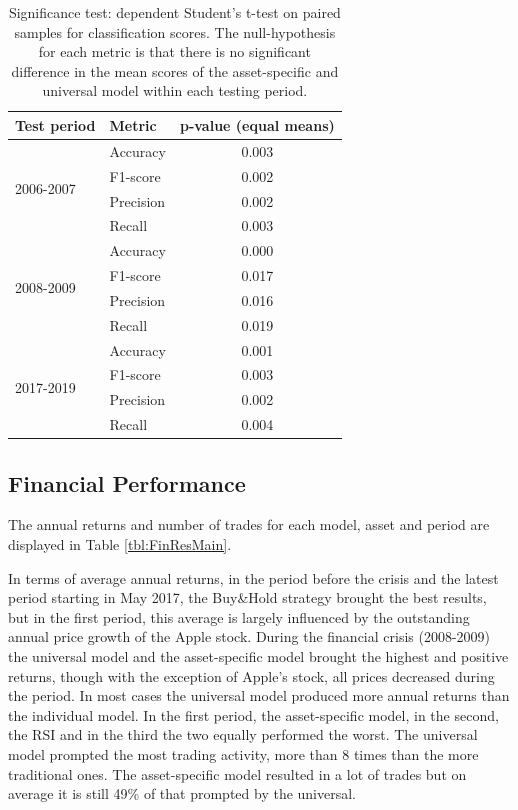 \documentclass[11pt, a4paper]{article}
\begin{document}
\begin{table}[H]
\centering
\begin{tabular}{l|l|c}
 Test period & Metric    & \multicolumn{1}{c}{p-value (equal means)} \\ \hline \hline
 \multirow{4}{1cm}{2006-2007}  & Accuracy  & 0.003                  \\
 & F1-score   & 0.002                  \\
 & Precision & 0.002                  \\
 & Recall  & 0.003                  \\ \hline
 \multirow{4}{1cm}{2008-2009} & Accuracy  & 0.000                  \\
 & F1-score   & 0.017                  \\
 & Precision & 0.016                  \\
 & Recall  & 0.019                  \\ \hline
 \multirow{4}{1cm}{2017-2019} & Accuracy  & 0.001                  \\
 & F1-score   & 0.003                  \\
 & Precision & 0.002                  \\
 & Recall  & 0.004                 
\end{tabular}
\caption{Significance test: dependent Student's t-test on paired samples for classification scores. The null-hypothesis for each metric is that there is no significant difference in the mean scores of the asset-specific and universal model within each testing period.}
\label{tbl:ClassSign}
\end{table}

\subsection{Financial Performance}
\label{subsec:ER:FinPerf}

The annual returns and number of trades for each model, asset and period are displayed in Table \ref{tbl:FinResMain}. 

In terms of average annual returns, in the period before the crisis and the latest period starting in May 2017, the Buy\&Hold strategy brought the best results, but in the first period, this average is largely influenced by the outstanding annual price growth of the Apple stock. During the financial crisis (2008-2009) the universal model and the asset-specific model brought the highest and positive returns, though with the exception of Apple's stock, all prices decreased during the period. In most cases the universal model produced more annual returns than the individual model. In the first period, the asset-specific model, in the second, the RSI and in the third the two equally performed the worst. The universal model prompted the most trading activity, more than 8 times than the more traditional ones. The asset-specific model resulted in a lot of trades but on average it is still  49\% of that prompted by the universal. 
\end{document}
